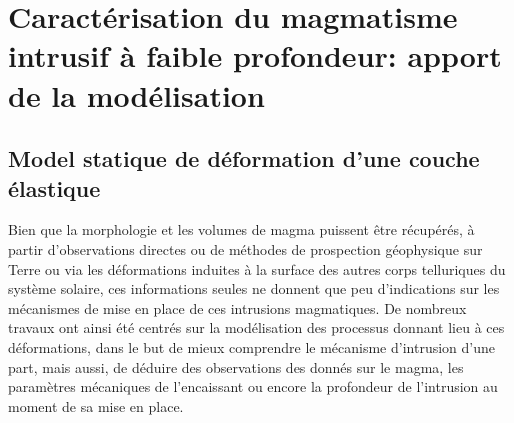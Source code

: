 \section{Caractérisation du  magmatisme intrusif à  faible profondeur:
  apport de la modélisation}
\label{sec:orign-theor-fram}

\subsection{Model statique de déformation d'une couche élastique}
\label{sec:model-statique-de}

Bien  que  la  morphologie  et  les volumes  de  magma  puissent  être
récupérés,  à  partir  d'observations   directes  ou  de  méthodes  de
prospection géophysique sur  Terre ou via les  déformations induites à
la  surface  des autres  corps  telluriques  du système  solaire,  ces
informations  seules   ne  donnent  que  peu   d'indications  sur  les
mécanismes  de  mise  en  place de  ces  intrusions  magmatiques.   De
nombreux  travaux  ont  ainsi  été centrés  sur  la  modélisation  des
processus  donnant lieu  à  ces  déformations, dans  le  but de  mieux
comprendre le mécanisme d'intrusion d'une part, mais aussi, de déduire
des observations des donnés sur le magma, les paramètres mécaniques de
l'encaissant ou  encore la profondeur  de l'intrusion au moment  de sa
mise en place.

